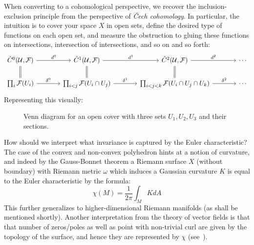 \documentclass{ut-thesis}
\newcommand{\CF}{{\mathcal{F}}}
\begin{document}
When converting to a cohomological perspective, we recover the inclusion-exclusion principle from the
perspective of \emph{\v{C}ech cohomology}. In particular, the intuition is to cover your space $X$ in open
sets, define the desired type of functions on each open set, and measure the obstruction to gluing these
functions on intersections, intersection of intersections, and so on and so forth:
\[
\begin{tikzcd}[column sep=large]
\check{C}^0(\mathcal{U}, \CF) \arrow[r, "d^0"] & \check{C}^1(\mathcal{U}, \CF) \arrow[r, "d^1"] & \check{C}^2(\mathcal{U}, \CF) \arrow[r, "d^2"] & \cdots \\
\prod_{i} \CF(U_i) \arrow[u, equal] \arrow[r, "\delta^0"] & \prod_{i<j} \CF(U_i \cap U_j) \arrow[u, equal] \arrow[r, "\delta^1"] & \prod_{i<j<k} \CF(U_i \cap U_j \cap U_k) \arrow[u, equal] \arrow[r, "\delta^2"] & \cdots
\end{tikzcd}
\]
Representing this visually:

\begin{figure}[H]
\centering
{}
\caption{Venn diagram for an open cover with three sets $U_1, U_2, U_3$ and their sections.}
\end{figure}

How should we interpret what invariance is captured by the Euler characteristic? The case of the convex and
non-convex polyhedron hints at a notion of curvature, and indeed by the Gauss-Bonnet theorem a Riemann surface
$X$ (without boundary) with Riemann metric $\omega$ which induces a Gaussian curvature $K$ is equal to the
Euler characteristic by the formula:
\[
  \chi(M) = \frac{1}{2\pi }\int_M K dA
\]
This further generalizes to higher-dimensional Riemann manifolds (as shall be mentioned shortly). Another
interpretation from the theory of vector fields is that that number of zeros/poles as well as point with
non-trivial curl are given by the topology of the surface, and hence they are represented by $\chi$
(see~\cite{NateAlgTop}).
\end{document}
